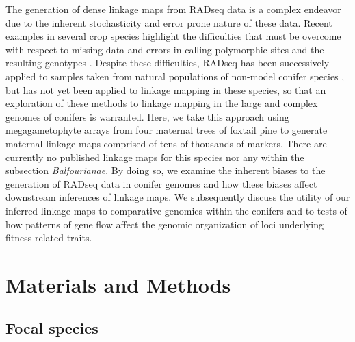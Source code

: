 \documentclass[11pt]{article}
\begin{document}
The generation of dense linkage maps from RADseq data is a complex endeavor due to the inherent stochasticity
and error prone nature of these data. Recent examples in several crop species highlight the
difficulties that must be overcome with respect to missing data and errors in calling polymorphic sites 
and the resulting genotypes \citep{Pfender:2011, Ward:2013}. Despite these difficulties, RADseq has been 
successively applied to samples taken from natural populations of non-model conifer species \citep{Parchman:2012}, but has not yet 
been applied to linkage mapping in these species, so that an exploration of these methods to linkage mapping in the large and complex 
genomes of conifers is warranted. Here, we take this approach using megagametophyte arrays from four maternal trees of foxtail pine
to generate maternal linkage maps comprised of tens of thousands of markers. There are currently no published linkage 
maps for this species nor any within the subsection \textit{Balfourianae}. By doing so, we examine the inherent biases
to the generation of RADseq data in conifer genomes and how these biases affect downstream inferences of linkage maps. We subsequently discuss
the utility of our inferred linkage maps to comparative genomics within the conifers and to tests of how patterns of gene flow 
affect the genomic organization of loci underlying fitness-related traits.

\section*{Materials and Methods}\label{s:materialsandmethods}

\subsection*{Focal species}\label{ss:species}
\end{document}
